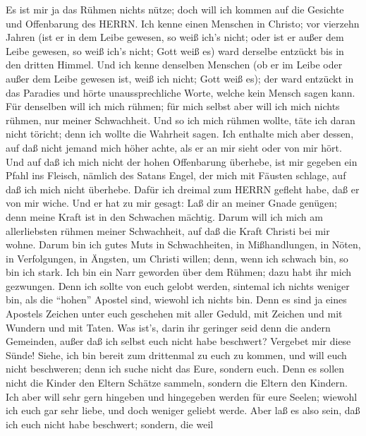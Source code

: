  Es ist mir ja das Rühmen nichts nütze; doch will ich kommen
auf die Gesichte und Offenbarung des HERRN.  Ich kenne einen
Menschen in Christo; vor vierzehn Jahren (ist er in dem Leibe gewesen,
so weiß ich's nicht; oder ist er außer dem Leibe gewesen, so weiß ich's
nicht; Gott weiß es) ward derselbe entzückt bis in den dritten Himmel.
 Und ich kenne denselben Menschen (ob er im Leibe oder außer
dem Leibe gewesen ist, weiß ich nicht; Gott weiß es);  der
ward entzückt in das Paradies und hörte unaussprechliche Worte, welche
kein Mensch sagen kann.  Für denselben will ich mich rühmen;
für mich selbst aber will ich mich nichts rühmen, nur meiner
Schwachheit.  Und so ich mich rühmen wollte, täte ich daran
nicht töricht; denn ich wollte die Wahrheit sagen. Ich enthalte mich
aber dessen, auf daß nicht jemand mich höher achte, als er an mir sieht
oder von mir hört.  Und auf daß ich mich nicht der hohen
Offenbarung überhebe, ist mir gegeben ein Pfahl ins Fleisch, nämlich des
Satans Engel, der mich mit Fäusten schlage, auf daß ich mich nicht
überhebe.  Dafür ich dreimal zum HERRN gefleht habe, daß er
von mir wiche.  Und er hat zu mir gesagt: Laß dir an meiner
Gnade genügen; denn meine Kraft ist in den Schwachen mächtig. Darum will
ich mich am allerliebsten rühmen meiner Schwachheit, auf daß die Kraft
Christi bei mir wohne.  Darum bin ich gutes Muts in
Schwachheiten, in Mißhandlungen, in Nöten, in Verfolgungen, in Ängsten,
um Christi willen; denn, wenn ich schwach bin, so bin ich stark.
 Ich bin ein Narr geworden über dem Rühmen; dazu habt ihr
mich gezwungen. Denn ich sollte von euch gelobt werden, sintemal ich
nichts weniger bin, als die ``hohen'' Apostel sind, wiewohl ich nichts
bin.  Denn es sind ja eines Apostels Zeichen unter euch
geschehen mit aller Geduld, mit Zeichen und mit Wundern und mit Taten.
 Was ist's, darin ihr geringer seid denn die andern
Gemeinden, außer daß ich selbst euch nicht habe beschwert? Vergebet mir
diese Sünde!  Siehe, ich bin bereit zum drittenmal zu euch
zu kommen, und will euch nicht beschweren; denn ich suche nicht das
Eure, sondern euch. Denn es sollen nicht die Kinder den Eltern Schätze
sammeln, sondern die Eltern den Kindern.  Ich aber will
sehr gern hingeben und hingegeben werden für eure Seelen; wiewohl ich
euch gar sehr liebe, und doch weniger geliebt werde.  Aber
laß es also sein, daß ich euch nicht habe beschwert; sondern, die weil
